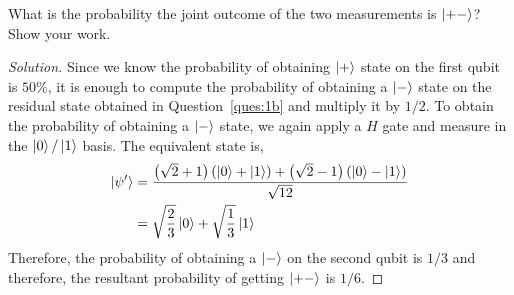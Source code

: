 \begin{solution}[label=ques:1c]
  \begin{question}
    What is the probability the joint outcome of the two measurements is $\ket{+-}$?
    Show your work.
  \end{question}
  \tcblower{}
  \begin{proof}[Solution]
    Since we know the probability of obtaining $\ket{+}$ state on the first qubit is $50\%$, it is enough to compute the probability of obtaining a $\ket{-}$ state on the residual state obtained in Question~\ref{ques:1b} and multiply it by $1/2$. To obtain the probability of obtaining a $\ket{-}$ state, we again apply a $H$ gate and measure in the $\ket{0}/\ket{1}$ basis. The equivalent state is,
    \begin{equation}
      \begin{split}
        \ket{\psi'} &= \frac{\left(\sqrt{2} + 1\right)(\ket{0} + \ket{1}) + \left(\sqrt{2} - 1\right)(\ket{0} - \ket{1})}{\sqrt{12}}\\
        &= \sqrt{\frac{2}{3}}\ket{0} + \sqrt{\frac{1}{3}}\ket{1}
      \end{split}
    \end{equation}
    Therefore, the probability of obtaining a $\ket{-}$ on the second qubit is $1/3$ and therefore, the resultant probability of getting $\ket{+-}$ is $1/6$.
  \end{proof}
\end{solution}
